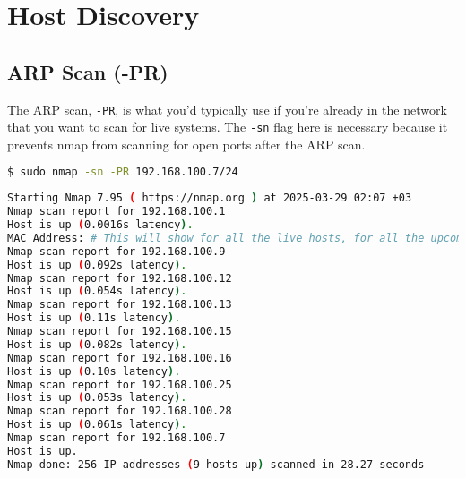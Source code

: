\documentclass[11pt,a4paper]{article}
\newenvironment{commandbox}[1][]{
  \begin{tcolorbox}[
      colback=kalibackground,
      colframe=commandcolor,
      fonttitle=\bfseries\color{white},
      title=#1,
      breakable=true
    ]
  }{
  \end{tcolorbox}
}
\begin{document}
\label{before-aggressive-scan}

\clearpage  %



\section{Host Discovery}

\subsection{ARP Scan (-PR)}

The ARP scan, \texttt{-PR}, is what you'd typically use if you're
already in the network that you want to scan for live systems. The
\texttt{-sn} flag here is necessary because it prevents nmap from
scanning for open ports after the ARP scan.

\begin{commandbox}[ARP Scan]
\begin{lstlisting}[language=bash, style=bash, basicstyle=\small\ttfamily\color{warningcolor}]
$ sudo nmap -sn -PR 192.168.100.7/24
\end{lstlisting}

\begin{lstlisting}[basicstyle=\small\ttfamily\color{kalitext}, language=bash, style=bash, breaklines=true, breakindent=0pt]
Starting Nmap 7.95 ( https://nmap.org ) at 2025-03-29 02:07 +03
Nmap scan report for 192.168.100.1
Host is up (0.0016s latency).
MAC Address: # This will show for all the live hosts, for all the upcoming Discovery Host scans in this document, but I'll redact them just in case.
Nmap scan report for 192.168.100.9
Host is up (0.092s latency).
Nmap scan report for 192.168.100.12
Host is up (0.054s latency).
Nmap scan report for 192.168.100.13
Host is up (0.11s latency).
Nmap scan report for 192.168.100.15
Host is up (0.082s latency).
Nmap scan report for 192.168.100.16
Host is up (0.10s latency).
Nmap scan report for 192.168.100.25
Host is up (0.053s latency).
Nmap scan report for 192.168.100.28
Host is up (0.061s latency).
Nmap scan report for 192.168.100.7
Host is up.
Nmap done: 256 IP addresses (9 hosts up) scanned in 28.27 seconds
\end{lstlisting}
\end{commandbox}
\end{document}
